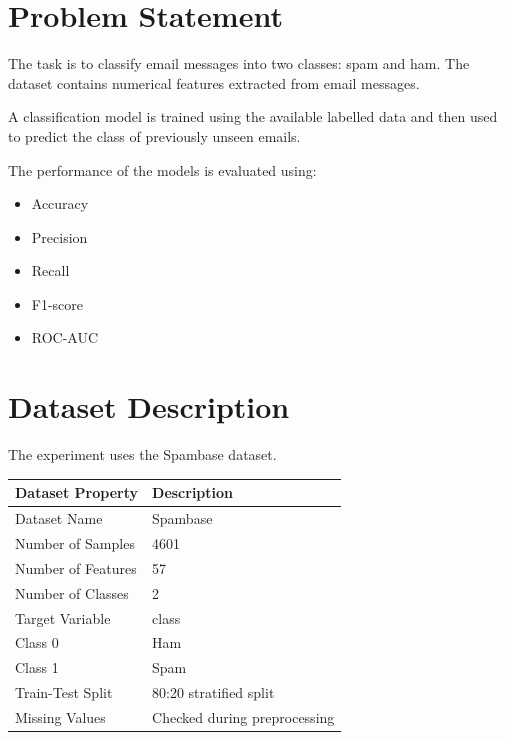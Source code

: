 \documentclass[12pt,a4paper]{article}
\begin{document}

\section{Problem Statement}

The task is to classify email messages into two classes: spam and ham. The dataset contains numerical features extracted from email messages.

A classification model is trained using the available labelled data and then used to predict the class of previously unseen emails.

The performance of the models is evaluated using:

\begin{itemize}
    \item Accuracy
    \item Precision
    \item Recall
    \item F1-score
    \item ROC-AUC
\end{itemize}


\section{Dataset Description}

The experiment uses the Spambase dataset.

\begin{longtable}{|p{6cm}|p{8cm}|}
\hline
\textbf{Dataset Property} & \textbf{Description} \\ \hline

Dataset Name & Spambase \\ \hline

Number of Samples & 4601 \\ \hline

Number of Features & 57 \\ \hline

Number of Classes & 2 \\ \hline

Target Variable & class \\ \hline

Class 0 & Ham \\ \hline

Class 1 & Spam \\ \hline

Train-Test Split & 80:20 stratified split \\ \hline

Missing Values & Checked during preprocessing \\ \hline

\end{longtable}
\end{document}
